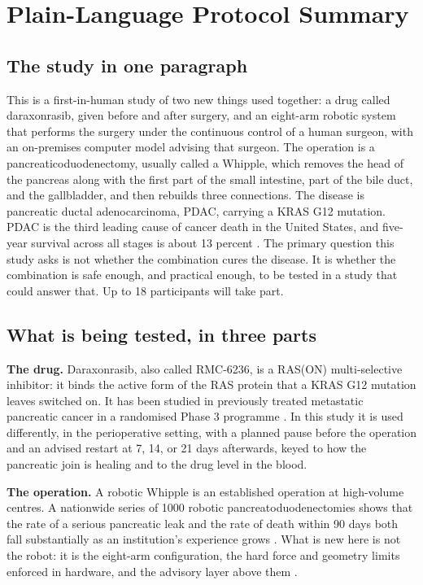\section{Plain-Language Protocol Summary}

\subsection{The study in one paragraph}

This is a first-in-human study of two new things used together: a drug called
daraxonrasib, given before and after surgery, and an eight-arm robotic system
that performs the surgery under the continuous control of a human surgeon, with
an on-premises computer model advising that surgeon. The operation is a
pancreaticoduodenectomy, usually called a Whipple, which removes the head of the
pancreas along with the first part of the small intestine, part of the bile
duct, and the gallbladder, and then rebuilds three connections. The disease is
pancreatic ductal adenocarcinoma, PDAC, carrying a KRAS G12 mutation. PDAC is
the third leading cause of cancer death in the United States, and five-year
survival across all stages is about 13 percent \cite{Siegel2025}. The primary
question this study asks is not whether the combination cures the disease. It is
whether the combination is safe enough, and practical enough, to be tested in a
study that could answer that. Up to 18 participants will take part.

\subsection{What is being tested, in three parts}

\textbf{The drug.} Daraxonrasib, also called RMC-6236, is a RAS(ON)
multi-selective inhibitor: it binds the active form of the RAS protein that a
KRAS G12 mutation leaves switched on. It has been studied in previously treated
metastatic pancreatic cancer in a randomised Phase 3 programme
\cite{rasolute302, oreilly2026darax}. In this study it is used differently, in
the perioperative setting, with a planned pause before the operation and an
advised restart at 7, 14, or 21 days afterwards, keyed to how the pancreatic
join is healing and to the drug level in the blood.

\textbf{The operation.} A robotic Whipple is an established operation at
high-volume centres. A nationwide series of 1000 robotic
pancreatoduodenectomies shows that the rate of a serious pancreatic leak and the
rate of death within 90 days both fall substantially as an institution's
experience grows \cite{DutchCohort2025}. What is new here is not the robot: it
is the eight-arm configuration, the hard force and geometry limits enforced in
hardware, and the advisory layer above them \cite{onpremwhippl}.

